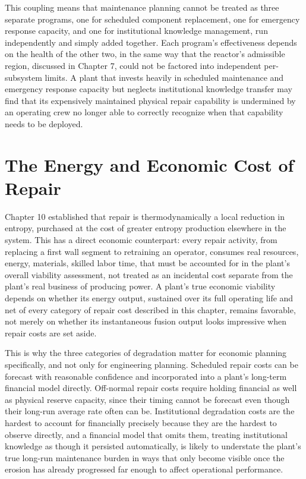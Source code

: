 This coupling means that maintenance planning cannot be treated as three separate programs, one for scheduled component replacement, one for emergency response capacity, and one for institutional knowledge management, run independently and simply added together. Each program's effectiveness depends on the health of the other two, in the same way that the reactor's admissible region, discussed in Chapter 7, could not be factored into independent per-subsystem limits. A plant that invests heavily in scheduled maintenance and emergency response capacity but neglects institutional knowledge transfer may find that its expensively maintained physical repair capability is undermined by an operating crew no longer able to correctly recognize when that capability needs to be deployed.

\section{The Energy and Economic Cost of Repair}

Chapter 10 established that repair is thermodynamically a local reduction in entropy, purchased at the cost of greater entropy production elsewhere in the system. This has a direct economic counterpart: every repair activity, from replacing a first wall segment to retraining an operator, consumes real resources, energy, materials, skilled labor time, that must be accounted for in the plant's overall viability assessment, not treated as an incidental cost separate from the plant's real business of producing power. A plant's true economic viability depends on whether its energy output, sustained over its full operating life and net of every category of repair cost described in this chapter, remains favorable, not merely on whether its instantaneous fusion output looks impressive when repair costs are set aside.

This is why the three categories of degradation matter for economic planning specifically, and not only for engineering planning. Scheduled repair costs can be forecast with reasonable confidence and incorporated into a plant's long-term financial model directly. Off-normal repair costs require holding financial as well as physical reserve capacity, since their timing cannot be forecast even though their long-run average rate often can be. Institutional degradation costs are the hardest to account for financially precisely because they are the hardest to observe directly, and a financial model that omits them, treating institutional knowledge as though it persisted automatically, is likely to understate the plant's true long-run maintenance burden in ways that only become visible once the erosion has already progressed far enough to affect operational performance.

